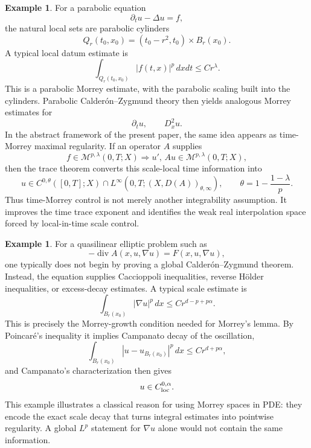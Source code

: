 \documentclass[11pt]{article}
\theoremstyle{definition}
\newtheorem{example}[theorem]{Example}
\begin{document}
\begin{example}\label{ex:parabolic-cylinders-morrey}
For a parabolic equation
\[
        \partial_t u-\Delta u=f,
\]
the natural local sets are parabolic cylinders
\[
        Q_r(t_0,x_0)=(t_0-r^2,t_0)\times B_r(x_0).
\]
A typical local datum estimate is
\[
        \int_{Q_r(t_0,x_0)} |f(t,x)|^p\,dxdt\le C r^\lambda .
\]
This is a parabolic Morrey estimate, with the parabolic scaling built into the cylinders.  Parabolic Calder\'on--Zygmund theory then yields analogous Morrey estimates for
\[
        \partial_t u,
        \qquad
        D_x^2u.
\]
In the abstract framework of the present paper, the same idea appears as time-Morrey maximal regularity.  If an operator $A$ supplies
\[
        f\in \mathcal M^{p,\lambda}(0,T;X)
        \Longrightarrow
        u',\,Au\in \mathcal M^{p,\lambda}(0,T;X),
\]
then the trace theorem converts this scale-local time information into
\[
        u\in C^{0,\theta}([0,T];X)
        \cap
        L^\infty(0,T;(X,D(A))_{\theta,\infty}),
        \qquad
        \theta=1-\frac{1-\lambda}{p}.
\]
Thus time-Morrey control is not merely another integrability assumption.  It improves the time trace exponent and identifies the weak real interpolation space forced by local-in-time scale control.
\end{example}

\begin{example}\label{ex:quasilinear-caccioppoli-morrey}
For a quasilinear elliptic problem such as
\[
        -\operatorname{div} A(x,u,\nabla u)=F(x,u,\nabla u),
\]
one typically does not begin by proving a global Calder\'on--Zygmund theorem.  Instead, the equation supplies Caccioppoli inequalities, reverse H\"older inequalities, or excess-decay estimates.  A typical scale estimate is
\[
        \int_{B_r(x_0)} |\nabla u|^p\,dx
        \le
        C r^{d-p+p\alpha}.
\]
This is precisely the Morrey-growth condition needed for Morrey's lemma.  By Poincar\'e's inequality it implies Campanato decay of the oscillation,
\[
        \int_{B_r(x_0)} |u-u_{B_r(x_0)}|^p\,dx
        \le
        C r^{d+p\alpha},
\]
and Campanato's characterization then gives
\[
        u\in C^{0,\alpha}_{\rm loc}.
\]
This example illustrates a classical reason for using Morrey spaces in PDE: they encode the exact scale decay that turns integral estimates into pointwise regularity.  A global $L^p$ statement for $\nabla u$ alone would not contain the same information.
\end{example}
\end{document}
